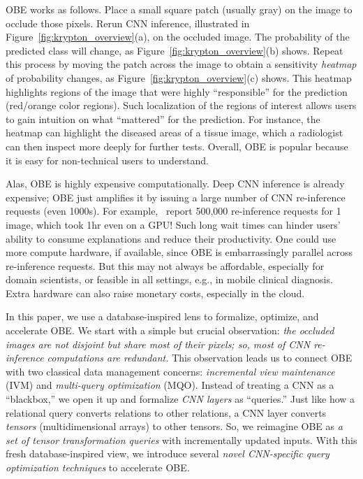 OBE works as follows. Place a small square patch (usually gray) on the image to occlude those pixels. Rerun CNN inference, illustrated in Figure~\ref{fig:krypton_overview}(a), on the occluded image. The probability of the predicted class will change, as Figure~\ref{fig:krypton_overview}(b) shows. Repeat this process by moving the patch across the image to obtain a sensitivity \textit{heatmap} of probability changes, as Figure~\ref{fig:krypton_overview}(c) shows. This heatmap highlights regions of the image that were highly ``responsible'' for the prediction (red/orange color regions). Such localization of the regions of interest allows users to gain intuition on what ``mattered'' for the prediction. For instance, the heatmap can highlight the diseased areas of a tissue image, which a radiologist can then inspect more deeply for further tests. 
Overall, OBE is popular because it is easy for non-technical users to understand.

Alas, OBE is highly expensive computationally. Deep CNN inference is already expensive; OBE just amplifies it by issuing a large number of CNN re-inference requests (even 1000s). For example,~\cite{zintgraf2017visualizing} report 500,000 re-inference requests for 1 image, which took 1hr even on a GPU! Such long wait times can hinder users' ability to consume explanations and reduce their productivity. One could use more compute hardware, if available, since OBE is embarrassingly parallel across re-inference requests. But this may not always be affordable, especially for domain scientists, or feasible in all settings, e.g., in mobile clinical diagnosis. Extra hardware can also raise monetary costs, especially in the cloud.

In this paper, we use a database-inspired lens to formalize, optimize, and accelerate OBE. We start with a simple but crucial observation: \textit{the occluded images are not disjoint but share most of their pixels; so, most of CNN re-inference computations are redundant.} This observation leads us to connect OBE with two classical data management concerns: \textit{incremental view maintenance} (IVM) and \textit{multi-query optimization} (MQO). Instead of treating a CNN as a ``blackbox,'' we open it up and formalize \textit{CNN layers} as ``queries.'' Just like how a relational query converts relations to other relations, a CNN layer converts \textit{tensors} (multidimensional arrays) to other tensors. So, we reimagine OBE as \textit{a set of tensor transformation queries} with incrementally updated inputs. With this fresh database-inspired view, we introduce several \textit{novel CNN-specific query optimization techniques} to accelerate OBE.

